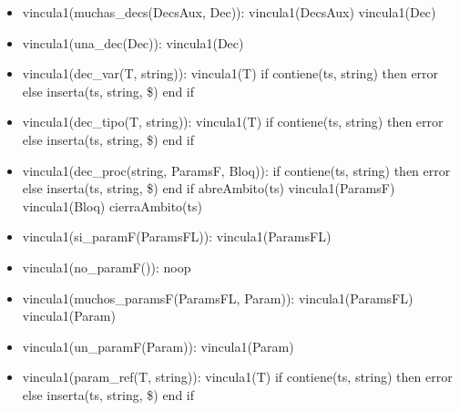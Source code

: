 \documentclass[11pt]{article}
\begin{document}
            \begin{itemize}
                \item vincula1(muchas\_decs(DecsAux, Dec)):
                    \subitem vincula1(DecsAux)
                    \subitem vincula1(Dec)
                \item vincula1(una\_dec(Dec)):
                    \subitem vincula1(Dec)
                \item vincula1(dec\_var(T, string)):
                    \subitem vincula1(T)
                    \subitem if contiene(ts, string) then
                        \subsubitem error
                    \subitem else
                        \subsubitem inserta(ts, string, \$)
                    \subitem end if 
                \item vincula1(dec\_tipo(T, string)):
                    \subitem vincula1(T)
                    \subitem if contiene(ts, string) then
                        \subsubitem error
                    \subitem else
                        \subsubitem inserta(ts, string, \$)
                    \subitem end if
                \item vincula1(dec\_proc(string, ParamsF, Bloq)):
                    \subitem if contiene(ts, string) then
                        \subsubitem error
                    \subitem else
                        \subsubitem inserta(ts, string, \$)
                    \subitem end if
                    \subitem abreAmbito(ts)
                    \subitem vincula1(ParamsF)
                    \subitem vincula1(Bloq)
                    \subitem cierraAmbito(ts)
                \item vincula1(si\_paramF(ParamsFL)):
                    \subitem vincula1(ParamsFL)
                \item vincula1(no\_paramF()):
                    \subitem noop
                \item vincula1(muchos\_paramsF(ParamsFL, Param)):
                    \subitem vincula1(ParamsFL)
                    \subitem vincula1(Param)
                \item vincula1(un\_paramF(Param)): 
                    \subitem vincula1(Param) 
                \item vincula1(param\_ref(T, string)): 
                    \subitem vincula1(T) 
                    \subitem if contiene(ts, string) then 
                        \subsubitem error 
                    \subitem else 
                        \subsubitem inserta(ts, string, \$) 
                    \subitem end if

\end{itemize}
\end{document}
